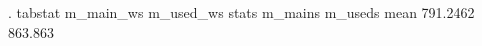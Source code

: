 . tabstat m_main_ws m_used_ws
{\smallskip}
   stats {\VBAR}  m_main{\tytilde}s  m_used{\tytilde}s
    mean {\VBAR}  791.2462   863.863
{\smallskip}
